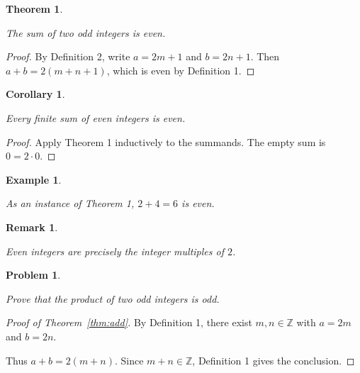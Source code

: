 \documentclass{article}
\newtheorem{theorem}{Theorem}
\newtheorem{corollary}{Corollary}
\newtheorem{example}{Example}
\newtheorem{remark}{Remark}
\newtheorem{problem}{Problem}
\begin{document}
\begin{theorem}

\label{thm:odd-sum}

The sum of two odd integers is even.

\end{theorem}

\begin{proof}

By Definition 2, write $a=2m+1$ and $b=2n+1$. Then $a+b=2(m+n+1)$, which is even by Definition 1.

\end{proof}

\newpage

\begin{corollary}

\label{cor:finite}

Every finite sum of even integers is even.

\end{corollary}

\begin{proof}

Apply Theorem 1 inductively to the summands. The empty sum is $0=2\cdot 0$.

\end{proof}

\begin{example}

\label{ex:add}

As an instance of Theorem 1, $2+4=6$ is even.

\end{example}

\begin{remark}

\label{rem:multiples}

Even integers are precisely the integer multiples of $2$.

\end{remark}

\begin{problem}

\label{problem:odd-product}

Prove that the product of two odd integers is odd.

\end{problem}

\newpage

\begin{proof}[Proof of Theorem~\ref{thm:add}]

By Definition 1, there exist $m,n\in\mathbb{Z}$ with $a=2m$ and $b=2n$.

Thus $a+b=2(m+n)$. Since $m+n\in\mathbb{Z}$, Definition 1 gives the conclusion.

\end{proof}
\end{document}
